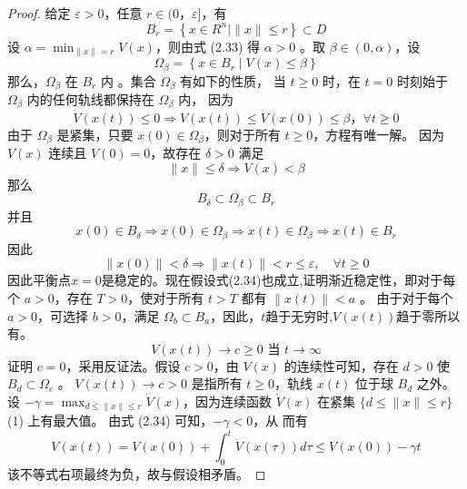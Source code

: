 \begin{proof}
    给定 $\varepsilon>0$，任意 $r \in(0，\varepsilon]$，有
    \begin{equation}
        B_r=\left\{x \in R^n \mid\|x\| \leqslant r\right\} \subset D
    \end{equation}
    设 $\alpha=\min _{\|x\|=r} V(x)$，则由式 (2.33) 得 $\alpha>0$ 。取 $\beta \in(0,\alpha)$，设
    \begin{equation}
        \Omega_\beta=\left\{x \in B_r \mid V(x) \leqslant \beta\right\}
    \end{equation}
    那么，$\Omega_\beta$ 在 $B_r$ 内  。集合 $\Omega_\beta$ 有如下的性质，
    当 $t \geqslant 0$ 时，在 $t=0$ 时刻始于 $\Omega_\beta$ 内的任何轨线都保持在 $\Omega_\beta$ 内， 因为
    \begin{equation}
        \dot{V}(x(t)) \leqslant 0 \Rightarrow V(x(t)) \leqslant V(x(0)) \leqslant \beta，\forall t \geqslant 0
    \end{equation}
    由于 $\Omega_\beta$ 是紧集，只要 $x(0) \in \Omega_\beta$，则对于所有 $t \geqslant 0$，方程有唯一解。
    因为 $V(x)$ 连续且 $V(0)=0$，故存在 $\delta>0$ 满足
    \begin{equation}
        \|x\| \leqslant \delta \Rightarrow V(x)<\beta
    \end{equation}
    那么
    \begin{equation}
        B_\delta \subset \Omega_\beta \subset B_r
    \end{equation}
    并且
    \begin{equation}
        x(0) \in B_\delta \Rightarrow x(0) \in \Omega_\beta \Rightarrow x(t) \in \Omega_\beta \Rightarrow x(t) \in B_r
    \end{equation}
    因此
    \begin{equation}
        \|x(0)\|<\delta \Rightarrow\|x(t)\|<r \leqslant \varepsilon,\quad \forall t \geqslant 0
    \end{equation}
    因此平衡点$x=0$是稳定的。现在假设式(2.34)也成立,证明渐近稳定性，即对于每个 $a>0$，存在 $T>0$，使对于所有 $t>T$ 都有 $\|x(t)\|<a$ 。
    由于对于每个 $a>0$，可选择 $b>0$，满足 $\Omega_b \subset B_a$，因此，$t$趋于无穷时,$V(x(t))$趋于零所以有。
    \begin{equation}
        V(x(t)) \rightarrow c \geqslant 0 \text { 当 } t \rightarrow \infty
    \end{equation}
    证明 $c=0$，采用反证法。假设 $c>0$，由 $V(x)$ 的连续性可知，存在 $d>0$ 使 $B_d \subset \Omega_c$ 。
    $V(x(t)) \rightarrow c>0$ 是指所有 $t \geqslant 0$，轨线 $x(t)$ 位于球 $B_d$ 之外。
    设 $-\gamma=\max _{d \leqslant\|x\| \leqslant r} \dot{V}(x)$，因为连续函数 $\dot{V}(x)$ 在紧集 $\{d \leqslant\|x\| \leqslant r\}$ (1) 上有最大值。
    由式 (2.34) 可知，$-\gamma<0$，从 而有
    \begin{equation}
        V(x(t))=V(x(0))+\int_0^t \dot{V}(x(\tau)) d \tau \leqslant V(x(0))-\gamma t
    \end{equation}
    该不等式右项最终为负，故与假设相矛盾。
\end{proof}
